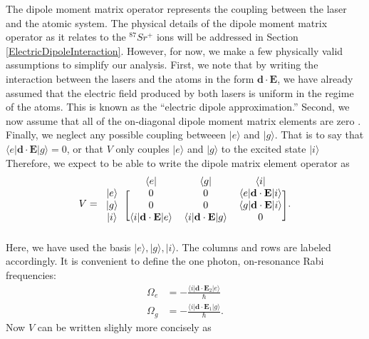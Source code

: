 The dipole moment matrix operator represents the coupling between the laser and the atomic system. The physical details of the dipole moment matrix operator as it relates to the $^{87}Sr^+$ ions will be addressed in Section\,\ref{ElectricDipoleInteraction}. 
However, for now, we make a few physically valid assumptions to simplify our analysis. First, we note that by writing the interaction between the lasers and the atoms in the form $\mathbf{d}\cdot\mathbf{E}$, we have already assumed that the electric field produced by both lasers is uniform in the regime of the atoms. This is known as the ``electric dipole approximation.'' Second, we now assume that all of the on-diagonal dipole moment matrix elements are zero \cite{cohenTannoudji}. Finally, we neglect any possible coupling betweeen $|e\rangle$ and $|g\rangle$. That is to say that $\langle e|\mathbf{d}\cdot\mathbf{E}|g\rangle=0$, or that $V$ only couples $|e\rangle$ and $|g\rangle$ to the excited state $|i\rangle$ Therefore, we expect to be able to write the dipole matrix element operator as 
\begin{equation}
\label{VSchrod}
V=
\begin{blockarray}{cccc}
&\langle e| & \langle g| & \langle i|\\
\begin{block}{c[ccc]}
|e\rangle & 0 & 0 & \langle e |\mathbf{d}\cdot\mathbf{E}|i\rangle\\
|g\rangle & 0 & 0 & \langle g |\mathbf{d}\cdot\mathbf{E}|i\rangle\\
|i\rangle & \langle i |\mathbf{d}\cdot\mathbf{E}|e\rangle & \langle i |\mathbf{d}\cdot\mathbf{E}|g\rangle& 0 \\
\end{block} 
\end{blockarray}.
\end{equation}
Here, we have used the basis $|e\rangle,|g\rangle,|i\rangle$. The columns and rows are labeled accordingly.
It is convenient to define the one photon, on-resonance Rabi frequencies:
\begin{align}
\label{RabiFrequencies1}
\Omega_e&=-\frac{\langle i | \mathbf{d}\cdot \mathbf{E}_2 | e\rangle }{\hbar}\\
\Omega_g&=-\frac{\langle i | \mathbf{d}\cdot \mathbf{E}_1 | g\rangle}{\hbar}.
\label{RabiFrequencies2}
\end{align}
Now $V$ can be written slighly more concisely as 
